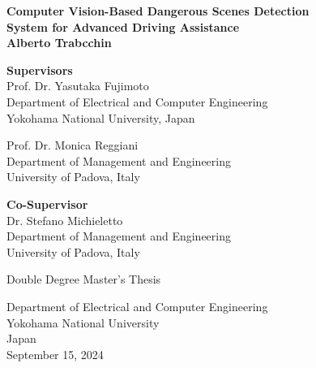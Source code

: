 \begin{titlepage}
\begin{center}

\vspace*{0.5cm}
\textbf{\Large{Computer Vision-Based Dangerous Scenes Detection}\\ 
        \vspace*{0.2cm}
        \Large{System for Advanced Driving Assistance}}\\
\vspace*{2cm}
\textbf{\large{Alberto Trabcchin}}\\
\vfill

\vspace*{1cm}

\begin{flushright}
\textbf{Supervisors} \\
\vspace*{0.5cm}
Prof. Dr. Yasutaka Fujimoto \\
Department of Electrical and Computer Engineering \\
Yokohama National University, Japan

\vspace*{0.5cm}

Prof. Dr. Monica Reggiani \\
Department of Management and Engineering \\
University of Padova, Italy

\vspace*{1cm}

\textbf{Co-Supervisor} \\
\vspace*{0.5cm}
Dr. Stefano Michieletto \\
Department of Management and Engineering \\
University of Padova, Italy
\end{flushright}

\vfill

Double Degree Master's Thesis\\
    
\vspace{0.8cm}

    
Department of Electrical and Computer Engineering\\
Yokohama National University\\
Japan\\
September 15, 2024
            
\end{center}
\end{titlepage}

\afterpage{\blankpage}